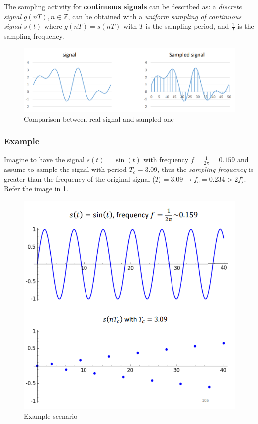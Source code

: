 \documentclass[10pt,a4paper]{report}
\theoremstyle{definition}
\begin{document}
The sampling activity for \textbf{continuous signals} can be described as:  a \textit{discrete signal} $g(nT), n \in \mathbb{Z}$, can be obtained with a \textit{uniform sampling of continuous signal $s(t)$} where
$g(nT) = s(nT)$
with $T$ is the sampling period, and $\frac{1}{T}$ is the sampling frequency.
\begin{figure}[h]
	\centering\includegraphics[scale=0.50]{images/Pasted image 20230526111416.png}
	\caption{Comparison between real signal and sampled one}
\end{figure}

\subsubsection{Example}\label{sec:example}
Imagine to have the signal $s(t)=\sin(t)$ with frequency $f = \frac{1}{2\pi} = 0.159$ and assume to sample the signal with period $T_{c} = 3.09$, thus the \textit{sampling frequency} is greater than the frequency of the original signal ($T_{c} = 3.09 \rightarrow f_{c} = 0.234 > 2f$). Refer the image in \ref{example-freq}.
\begin{figure}[h!]
	\centering\includegraphics[scale=0.35]{images/Pasted image 20230526111958.png}
	\caption{Example scenario}
\label{example-freq}
\end{figure}
\end{document}
